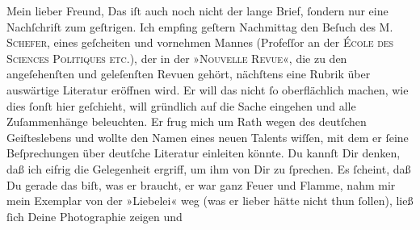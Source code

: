 \pstart\center{}Mein lieber Freund,\pend\vspace{0.5em}
\pstart
           Das iſt auch noch nicht der lange Brief,{ }ſondern nur eine Nachſchrift zum geſtrigen.
               Ich empfing geſtern{ }Nachmittag den Beſuch des \textsc{M. Schefer}, eines geſcheiten und vornehmen Mannes (Profeſſor an der \textsc{École des Sciences Politiques etc.}), der
               in der »\textsc{Nouvelle Revue}«, die zu den angeſehenſten und geleſenſten Revuen gehört, nächſtens eine Rubrik
               über auswärtige Literatur eröffnen wird. Er will das nicht{ }ſo oberflächlich machen,
               wie dies{ }ſonſt hier geſchieht, will gründlich auf die Sache {\pb}eingehen und alle Zuſammenhänge beleuchten. Er frug
               mich um Rath wegen des deutſchen Geiſteslebens und wollte den Namen eines neuen
               Talents wiſſen, mit dem er{ }ſeine Beſprechungen über deutſche Literatur einleiten
               könnte. Du kannſt Dir denken, daß ich eifrig die Gelegenheit ergriff, um ihm von Dir
               zu{ }ſprechen. Es{ }ſcheint, daß Du gerade das biſt, was er braucht, er war ganz Feuer
               und Flamme, nahm mir mein Exemplar von der »Liebelei« weg (was er lieber hätte nicht thun {\pb}ſollen), ließ{ }ſich Deine Photographie zeigen und
